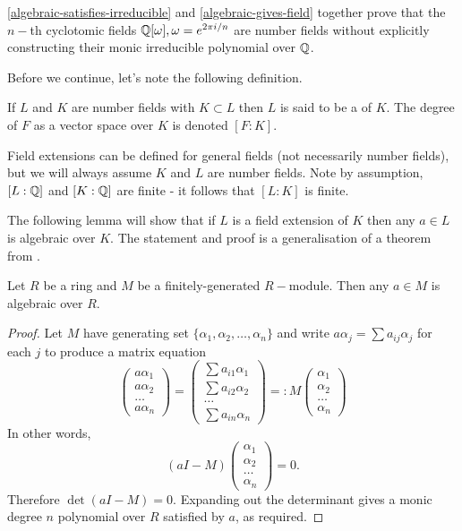 \begin{remark}
\cref{algebraic-satisfies-irreducible} and \cref{algebraic-gives-field} together prove that the $n-$th cyclotomic fields $\mathbb{Q}[\omega],\omega=e^{2\pi i/n}$ are number fields without explicitly constructing their monic irreducible polynomial over $\mathbb{Q}$. 
\end{remark}

Before we continue, let's note the following definition.
\begin{definition}
If $L$ and $K$ are number fields with $K\subset L$ then $L$ is said to be a  of $K$. The degree of $F$ as a vector space over $K$ is denoted $[F:K]$. 
\end{definition}
Field extensions can be defined for general fields (not necessarily number fields), but we will always assume $K$ and $L$ are number fields. Note by assumption, $[L:\mathbb{Q}]$ and $[K:\mathbb{Q}]$ are finite - it follows that $[L:K]$ is finite.

The following lemma will show that if $L$ is a field extension of $K$ then any $a\in L$ is algebraic over $K$. The statement and proof is a generalisation of a theorem from \cite{NumberFields}.

\begin{lemma}\label{a-algebraic-over-finitely-generated-ring}
Let $R$ be a ring and $M$ be a finitely-generated $R-$module. Then any $a\in M$ is algebraic over $R$.
\end{lemma}
\begin{proof}
Let $M$ have generating set $\{\alpha_1,\alpha_2,\dots,\alpha_n\}$ and write $a\alpha_j=\sum a_{ij}\alpha_j$ for each $j$ to produce a matrix equation
$$\begin{pmatrix}
    a\alpha_1\\
    a\alpha_2\\
    \dots\\
    a\alpha_n
\end{pmatrix}=\begin{pmatrix} \sum a_{i1}\alpha_1\\\sum a_{i2}\alpha_2\\\dots\\\sum a_{in}\alpha_n
\end{pmatrix}=: M\begin{pmatrix}\alpha_1\\\alpha_2\\\dots\\\alpha_n\end{pmatrix}$$
In other words,
\begin{equation}\label{eq-determinant-algebraic-over-R}(a I-M)\begin{pmatrix}\alpha_1\\\alpha_2\\\dots\\\alpha_n\end{pmatrix}=0.\end{equation}
Therefore $\det(aI-M)=0$. Expanding out the determinant gives a monic degree $n$ polynomial over $R$ satisfied by $a$, as required.
\end{proof}

